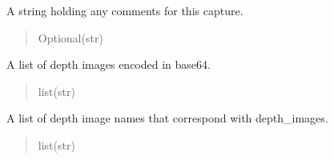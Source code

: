 \documentclass[letterpaper,10pt,english]{sphinxmanual}
\begin{document}
\begin{fulllineitems}
\begin{fulllineitems}
\begin{quote}
\begin{description}
\end{description}\end{quote}

\end{fulllineitems}


\begin{fulllineitems}
\label{\detokenize{modules/src.pig_sorting_api.main:src.pig_sorting_api.main.SwineDataSave.comment}}
\pysigstartsignatures
\pysigline
{}
\pysigstopsignatures
\sphinxAtStartPar
A string holding any comments for this capture.
\begin{quote}\begin{description}
\sphinxAtStartPar
Optional(str)

\end{description}\end{quote}

\end{fulllineitems}


\begin{fulllineitems}
\label{\detokenize{modules/src.pig_sorting_api.main:src.pig_sorting_api.main.SwineDataSave.depth_images}}
\pysigstartsignatures
\pysigline
{}
\pysigstopsignatures
\sphinxAtStartPar
A list of depth images encoded in base64.
\begin{quote}\begin{description}
\sphinxAtStartPar
list(str)

\end{description}\end{quote}

\end{fulllineitems}


\begin{fulllineitems}
\label{\detokenize{modules/src.pig_sorting_api.main:src.pig_sorting_api.main.SwineDataSave.depth_image_names}}
\pysigstartsignatures
\pysigline
{}
\pysigstopsignatures
\sphinxAtStartPar
A list of depth image names that correspond with depth\_images.
\begin{quote}\begin{description}
\sphinxAtStartPar
list(str)


\end{description}
\end{quote}
\end{fulllineitems}
\end{fulllineitems}
\end{document}
